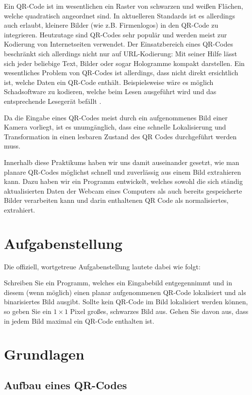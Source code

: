 \documentclass[a4paper, oneside, 12pt]{article}
\begin{document}
Ein QR-Code ist im wesentlichen ein Raster von schwarzen und weißen Flächen, welche quadratisch angeordnet sind. In aktuelleren Standards ist es allerdings auch erlaubt, kleinere Bilder (wie z.B. Firmenlogos) in den QR-Code zu integrieren. Heutzutage sind QR-Codes sehr populär und werden meist zur Kodierung von Internetseiten verwendet. Der Einsatzbereich eines QR-Codes beschränkt sich allerdings nicht nur auf URL-Kodierung: Mit seiner Hilfe lässt sich jeder beliebige Text, Bilder oder sogar Hologramme kompakt darstellen. Ein wesentliches Problem von QR-Codes ist allerdings, dass nicht direkt ersichtlich ist, welche Daten ein QR-Code enthält. Beispielsweise wäre es möglich Schadsoftware zu kodieren, welche beim Lesen ausgeführt wird und das entsprechende Lesegerät befällt \cite{security}.

Da die Eingabe eines QR-Codes meist durch ein aufgenommenes Bild einer Kamera vorliegt, ist es unumgänglich, dass eine schnelle Lokalisierung und Transformation in einen lesbaren Zustand des QR Codes durchgeführt werden muss.

Innerhalb diese Praktikums haben wir uns damit auseinander gesetzt, wie man planare QR-Codes möglichst schnell und zuverlässig aus einem Bild extrahieren kann. Dazu haben wir ein Programm entwickelt, welches sowohl die sich ständig aktualisierten Daten der Webcam eines Computers als auch bereits gespeicherte Bilder verarbeiten kann und darin enthaltenen QR Code als normalisiertes, extrahiert.

\section{Aufgabenstellung}
\label{s:aufgabenstellung}
Die offiziell, wortgetreue Aufgabenstellung lautete dabei wie folgt:

Schreiben Sie ein Programm, welches ein Eingabebild entgegennimmt und in diesem (wenn möglich) einen planar aufgenommenen QR-Code lokalisiert und als binarisiertes Bild ausgibt. Sollte kein QR-Code im Bild lokalisiert werden können, so geben Sie ein $1 \! \times \! 1$ Pixel großes, schwarzes Bild aus. Gehen Sie davon aus, dass in jedem Bild maximal ein QR-Code enthalten ist.


\newpage

\section{Grundlagen}
\label{s:grundlagen}

\subsection{Aufbau eines QR-Codes}
\label{ss:aufbau}
\end{document}
